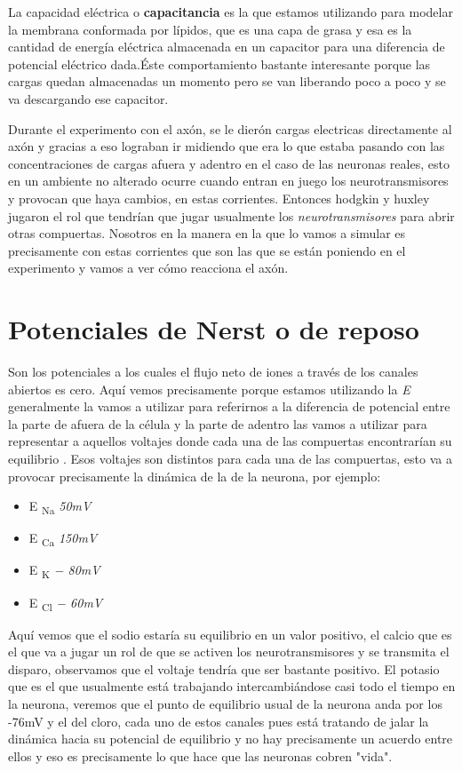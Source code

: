 La  capacidad eléctrica o \textbf{capacitancia} es la que estamos utilizando para modelar la membrana conformada por lípidos, que es una  capa de grasa y esa es la cantidad de energía eléctrica almacenada en un capacitor para una diferencia de potencial eléctrico dada.Éste comportamiento bastante interesante porque las cargas quedan almacenadas un momento pero se van liberando poco a poco y se va descargando ese capacitor. 

Durante el experimento con el axón, se le dierón cargas electricas directamente al axón y gracias a eso lograban ir midiendo que era lo que estaba pasando con las concentraciones de cargas afuera y adentro en el caso de las neuronas reales, esto en un ambiente no alterado ocurre cuando entran en juego los neurotransmisores y provocan que haya cambios, en estas corrientes. Entonces hodgkin y huxley  jugaron el rol que tendrían que jugar usualmente los \emph{neurotransmisores} para abrir otras compuertas. Nosotros en la manera en la que lo vamos a simular es precisamente con estas corrientes que son las que se están poniendo en el experimento y vamos a ver cómo reacciona el axón. 


\section{Potenciales de Nerst o de reposo}

Son los potenciales a los cuales el flujo neto de iones a través de los canales abiertos es cero.
Aquí vemos precisamente porque estamos utilizando la \emph{E} generalmente la vamos a utilizar para referirnos a la diferencia de potencial entre la parte de afuera de la célula y la parte de adentro  las vamos a utilizar para representar a aquellos voltajes donde cada una de las compuertas encontrarían su equilibrio . Esos voltajes son distintos para cada una de las compuertas, esto va a provocar precisamente la dinámica de la de la neurona, por ejemplo: 

\begin{itemize}
\item E \textsubscript{Na}  \emph{50mV}
\item E \textsubscript{Ca}  \emph{150mV}
\item E \textsubscript{K}   \emph{− 80mV}
\item E \textsubscript{Cl}  \emph{− 60mV}
\end{itemize}

Aquí vemos que el sodio estaría su equilibrio en un valor positivo, 
el calcio que es el que va a jugar un rol de que se activen los neurotransmisores y se transmita el disparo, observamos que el voltaje tendría que ser bastante positivo. El potasio que es el que usualmente está trabajando intercambiándose casi todo el tiempo en la neurona, veremos que el punto de equilibrio usual de la neurona anda por los -76mV y el del cloro, cada uno de estos canales pues está tratando de jalar la dinámica hacia su potencial de equilibrio y no hay precisamente un acuerdo entre ellos y eso es precisamente lo que hace que las neuronas cobren "vida".

